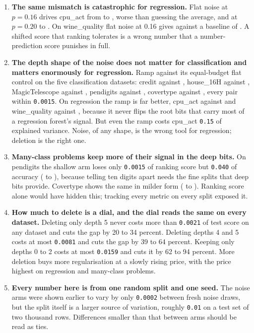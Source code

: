 \documentclass[11pt,a4paper]{article}
\newcommand{\num}[1]{\texttt{#1}}
\begin{document}
\begin{enumerate}
\item \textbf{The same mismatch is catastrophic for regression.} Flat noise at
$p = 0.16$ drives cpu\_act from \num{\cpuactBaseTest} to
\num{\cpuactCtrlTest}, worse than guessing the average, and at $p = 0.20$ to
\num{\cpuactUnifTest}. On wine\_quality flat noise at 0.16 gives
\num{\winequalityCtrlTest} against a baseline of \num{\winequalityBaseTest}.
A shifted score that ranking tolerates is a wrong number that a
number-prediction score punishes in full.

\item \textbf{The depth shape of the noise does not matter for classification
and matters enormously for regression.} Ramp against its equal-budget flat
control on the five classification datasets: credit \num{\creditRampTest}
against \num{\creditCtrlTest}, house\_16H \num{\houseSixteenHRampTest} against
\num{\houseSixteenHCtrlTest}, MagicTelescope \num{\MagicTelescopeRampTest}
against \num{\MagicTelescopeCtrlTest}, pendigits \num{\pendigitsRampTest}
against \num{\pendigitsCtrlTest}, covertype \num{\covertypeRampTest} against
\num{\covertypeCtrlTest}, every pair within \num{0.0015}. On regression the
ramp is far better, cpu\_act \num{\cpuactRampTest} against
\num{\cpuactCtrlTest} and wine\_quality \num{\winequalityRampTest} against
\num{\winequalityCtrlTest}, because it never flips the root bits that carry
most of a regression forest's signal. But even the ramp costs cpu\_act
\num{0.15} of explained variance. Noise, of any shape, is the wrong tool for
regression; deletion is the right one.

\item \textbf{Many-class problems keep more of their signal in the deep bits.}
On pendigits the shallow arm loses only \num{0.0015} of ranking score but
\num{0.040} of accuracy (\num{\pendigitsBaseTestAcc} to
\num{\pendigitsKeepTestAcc}), because telling ten digits apart needs the fine
splits that deep bits provide. Covertype shows the same in milder form
(\num{\covertypeBaseTestAcc} to \num{\covertypeKeepTestAcc}). Ranking score
alone would have hidden this; tracking every metric on every split exposed it.

\item \textbf{How much to delete is a dial, and the dial reads the same on
every dataset.} Deleting only depth 5 never costs more than \num{0.0021} of
test score on any dataset and cuts the gap by 20 to 34 percent. Deleting
depths 4 and 5 costs at most \num{0.0081} and cuts the gap by 39 to 64
percent. Keeping only depths 0 to 2 costs at most \num{0.0159} and cuts it by
62 to 94 percent. More deletion buys more regularisation at a slowly rising
price, with the price highest on regression and many-class problems.

\item \textbf{Every number here is from one random split and one seed.} The
noise arms were shown earlier to vary by only \num{0.0002} between fresh noise
draws, but the split itself is a larger source of variation, roughly
\num{0.01} on a test set of two thousand rows. Differences smaller than that
between arms should be read as ties.

\end{enumerate}
\end{document}
